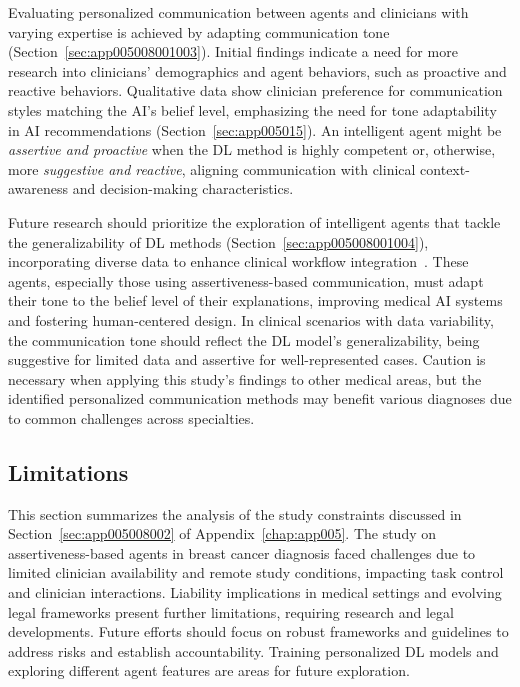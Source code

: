 \textcolor{revised}{Evaluating personalized communication between agents and clinicians with varying expertise is achieved by adapting communication tone (Section~\ref{sec:app005008001003}).
Initial findings indicate a need for more research into clinicians' demographics and agent behaviors, such as proactive and reactive behaviors.
Qualitative data show clinician preference for communication styles matching the \ac{AI}'s belief level, emphasizing the need for tone adaptability in \ac{AI} recommendations (Section~\ref{sec:app005015}).
An intelligent agent might be {\it assertive and proactive} when the \ac{DL} method is highly competent or, otherwise, more {\it suggestive and reactive}, aligning communication with clinical context-awareness and decision-making characteristics.}

\textcolor{revised}{Future research should prioritize the exploration of intelligent agents that tackle the generalizability of \ac{DL} methods (Section~\ref{sec:app005008001004}), incorporating diverse data to enhance clinical workflow integration~\cite{RASMY201811}.
These agents, especially those using assertiveness-based communication, must adapt their tone to the belief level of their explanations, improving medical \ac{AI} systems and fostering human-centered design.
In clinical scenarios with data variability, the communication tone should reflect the \ac{DL} model's generalizability, being suggestive for limited data and assertive for well-represented cases.
Caution is necessary when applying this study's findings to other medical areas, but the identified personalized communication methods may benefit various diagnoses due to common challenges across specialties.}

\subsection{Limitations}
\label{sec:chap006007002}

This section summarizes the analysis of the study constraints discussed in Section~\ref{sec:app005008002} of Appendix~\ref{chap:app005}.
The study on assertiveness-based agents in breast cancer diagnosis faced challenges due to limited clinician availability and remote study conditions, impacting task control and clinician interactions.
Liability implications in medical settings and evolving legal frameworks present further limitations, requiring research and legal developments.
Future efforts should focus on robust frameworks and guidelines to address risks and establish accountability.
Training personalized \ac{DL} models and exploring different agent features are areas for future exploration.

